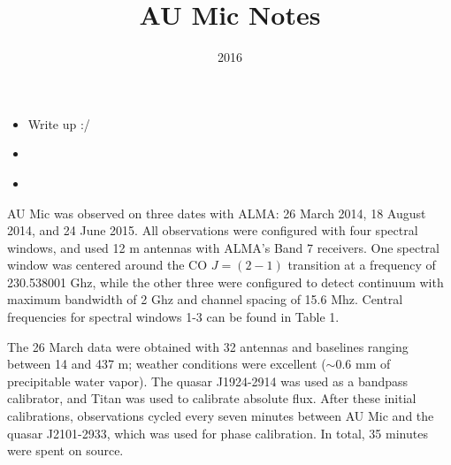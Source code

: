 \documentclass[a4paper]{tufte-handout}
\title{AU Mic Notes}
\date{2016}
\begin{document}
\maketitle


\begin{tasks}
	\begin{itemize}
		\item Write up :/
	\end{itemize}
\end{tasks}


\begin{maybe}
	\begin{itemize}
		\item
	\end{itemize}
\end{maybe}


\begin{mer}
	\begin{itemize}
		\item
	\end{itemize}

\end{mer}

AU Mic was observed on three dates with ALMA: 26 March 2014, 18 August 2014, and 24 June 2015. All observations were configured with four spectral windows, and used 12 m antennas with ALMA's Band 7 receivers. One spectral window was centered around the CO $J = (2-1)$ transition at a frequency of 230.538001 Ghz, while the other three were configured to detect continuum with maximum bandwidth of 2 Ghz and channel spacing of 15.6 Mhz. Central frequencies for spectral windows 1-3 can be found in Table 1.

The 26 March data were obtained with 32 antennas and baselines ranging between  14 and 437 m; weather conditions were excellent ($\sim$0.6 mm of precipitable water vapor). The quasar J1924-2914 was used as a bandpass calibrator, and Titan was used to calibrate absolute flux. After these initial calibrations, observations cycled every seven minutes between AU Mic and the quasar J2101-2933, which was used for phase calibration. In total, 35 minutes were spent on source.
\end{document}

